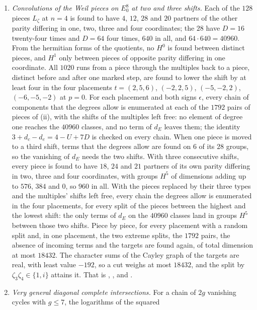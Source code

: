 \begin{enumerate}[label=\textup{(\Roman*)},leftmargin=*]
\item \emph{Convolutions of the Weil pieces on $E_0^8$ at two and three
  shifts.} Each
  of the $128$ pieces $L_{\zeta}$ at $n=4$ is found to have $4$, $12$, $28$
  and $20$ partners of the other parity differing in one, two, three and
  four coordinates; the $28$ have $D=16$ twenty-four times and $D=64$ four
  times, $640$ in all, and $64\cdot640=40960$. From the hermitian forms of
  the quotients, no $H^{0}$ is found between distinct pieces, and $H^{1}$
  only between pieces of opposite parity differing in one coordinate. All
  $1020$ runs from a piece through the multiples back to a piece, distinct
  before and after one marked step, are found to lower the shift by at least
  four in the four placements $t=(2,5,6)$, $(-2,2,5)$, $(-5,-2,2)$,
  $(-6,-5,-2)$ at $p=0$. For each placement and both signs $\epsilon$, every
  chain of components that the degrees allow is enumerated at each of the
  $1792$ pairs of pieces of (ii), with the shifts
  of the multiples left free: no element of degree one reaches the
  $40960$ classes, and no term of $d_{E}$ leaves them; the identity
  $3+d_{c}-d_{e}=4-U+7D$ is checked on every chain. When one piece is moved
  to a third shift, terms that the degrees allow are found on $6$ of its
  $28$ groups, so the vanishing of $d_{E}$ needs the two shifts. With
  three consecutive shifts, every piece is found to have $18$, $24$ and
  $21$ partners of its own parity differing in two, three and four
  coordinates, with groups $H^{5}$ of dimensions adding up to $576$, $384$
  and $0$, so $960$ in all. With the pieces replaced by their three types
  and the multiples' shifts left free, every chain the degrees allow is
  enumerated in the four placements, for every split of the pieces between
  the highest and the lowest shift: the only terms of $d_{E}$ on the
  $40960$ classes land in groups $H^{5}$ between those two shifts. Piece by
  piece, for every placement with a random split and, in one placement, the
  two extreme splits, the $1792$ pairs, the absence of incoming terms and
  the targets are found again, of total dimension at most $18432$. The
  character sums of the Cayley graph of the targets are real, with least
  value $-192$, so a cut weighs at most $18432$, and the split by
  $\zeta_{3}\zeta_{4}\in\{1,i\}$ attains it. That is ,
  ,  and
  .
\item \emph{Very general diagonal complete intersections.} For a chain of
  $2g$ vanishing cycles with $g\le7$, the logarithms of the squared

\end{enumerate}
